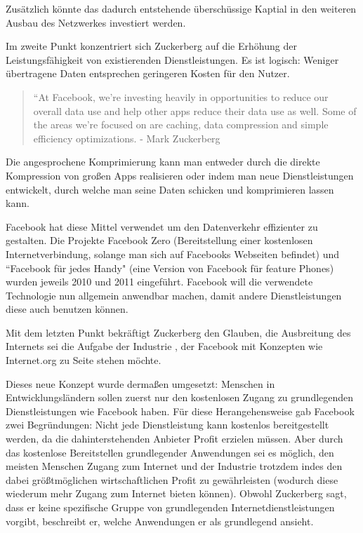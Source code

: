 \documentclass{article}
\begin{document}
Zusätzlich könnte das dadurch entstehende überschüssige Kaptial in den weiteren Ausbau des Netzwerkes investiert werden.

\medskip

Im zweite Punkt konzentriert sich Zuckerberg auf die Erhöhung der Leistungsfähigkeit von existierenden Dienstleistungen.
Es ist logisch: Weniger übertragene Daten entsprechen geringeren Kosten für den Nutzer.

\begin{quote}
``At Facebook, we’re investing heavily in opportunities to reduce our overall data use and help  other apps     
reduce their data use as well. Some of the areas we’re focused on are caching, data compression and simple efficiency optimizations.
- Mark Zuckerberg \textcite[8]{HumanRight}
\end{quote}

Die angesprochene Komprimierung kann man entweder durch die direkte Kompression von großen Apps realisieren oder indem man neue Dienstleistungen entwickelt, durch welche man seine Daten schicken und komprimieren lassen kann.

Facebook hat diese Mittel verwendet um den Datenverkehr effizienter zu gestalten.
Die Projekte Facebook Zero (Bereitstellung einer kostenlosen Internetverbindung, solange man sich auf Facebooks Webseiten befindet) und ``Facebook für jedes Handy" (eine Version von Facebook für feature Phones) wurden jeweils  2010 und 2011 eingeführt.
Facebook will die verwendete Technologie nun allgemein anwendbar machen, damit andere Dienstleistungen diese auch benutzen können.

\medskip

Mit dem letzten Punkt bekräftigt Zuckerberg den Glauben, die Ausbreitung des Internets sei die Aufgabe der Industrie , der Facebook mit Konzepten wie Internet.org zu Seite stehen möchte.

Dieses neue Konzept wurde dermaßen umgesetzt: Menschen in Entwicklungsländern sollen zuerst nur den kostenlosen Zugang zu grundlegenden Dienstleistungen wie Facebook haben.
Für diese Herangehensweise gab Facebook zwei Begründungen:
\medskip
Nicht jede Dienstleistung kann kostenlos bereitgestellt werden, da die dahinterstehenden Anbieter Profit erzielen müssen. 
Aber durch das kostenlose Bereitstellen grundlegender Anwendungen sei es möglich, den meisten Menschen Zugang zum Internet und der Industrie trotzdem indes den dabei größtmöglichen wirtschaftlichen Profit zu gewährleisten (wodurch diese wiederum mehr Zugang zum Internet bieten können).
Obwohl Zuckerberg sagt, dass er keine spezifische Gruppe von grundlegenden Internetdienstleistungen vorgibt, beschreibt er, welche Anwendungen er als grundlegend ansieht.
\end{document}
